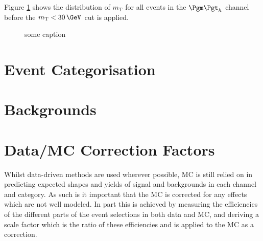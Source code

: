 Figure \ref{fig:transversemass} shows the distribution of $m_{\text{T}}$ for all
events in the $\mutau$ channel before the $m_{\text{T}}<30\,\GeV$ cut is
applied.

\begin{figure}[htb]
\begin{center}

\end{center}
\caption{
 some caption    
}
\label{fig:transversemass}
\end{figure}


\section{Event Categorisation}
\label{sec:eventcategorisation}


\section{Backgrounds}
\label{sec:backgrounds}


\section{Data/MC Correction Factors}
\label{sec:datamcfactors}

Whilst data-driven methods are used wherever possible, MC is still
relied on in predicting expected shapes and yields of signal and backgrounds in
each channel and category. As such is it important that the MC is corrected for
any effects which are not well modeled. In part this is achieved by measuring
the efficiencies of the different parts of the event selections in both data and
MC, and deriving a scale factor which is the ratio of these efficiencies and is
applied to the MC as a correction.


